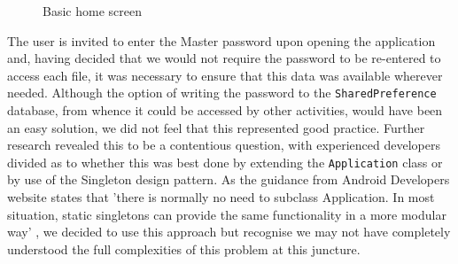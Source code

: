 \begin{figure}[h!]
                                                                                                                                                                                                         
    \caption{Basic home screen}
    \label{fig:main}
\end{figure}

The user is invited to enter the Master password upon opening the application and, having decided that we would not require the password to be re-entered to access each file, it was necessary to ensure that this data was available wherever needed. Although the option of writing the password to the  \texttt{SharedPreference} database, from whence it could be accessed by other activities, would have been an easy solution, we did not feel that this represented good practice.  Further research revealed this to be a contentious question, with experienced developers divided as to whether this was best done by extending the \texttt{Application} class or by use of the Singleton design pattern.  As the guidance from Android Developers website states that 'there is normally no need to subclass Application. In most situation, static singletons can provide the same functionality in a more modular way'   \cite{androiddev2} , we decided to use this approach but recognise we may not have completely understood the full complexities of this problem at this juncture.

